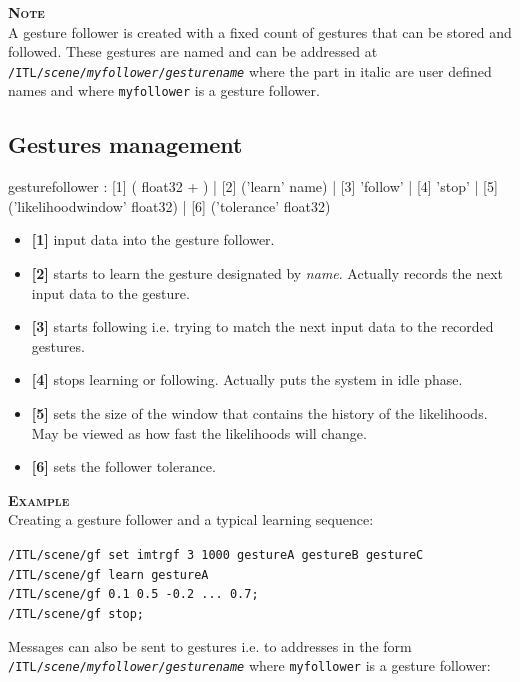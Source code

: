 \documentclass[a4paper,twoside]{report}
\newcommand{\subsublevel}[1]	{\subsection{#1}}
\newcommand{\OSC}[1]		{\texttt{#1}}
\newcommand{\example}		{\textbf{\hspace{-1.5cm}\textbf{\textsc{Example }}}}
\newcommand{\note}	[1]		{\vspace{2mm}\textbf{\hspace{-1.03cm}\textbf{\textsc{Note #1}}}}
\newcommand{\sample}	[1]			{\vspace{-2mm}\begin{center}\colorbox{mygrey}{
								\begin{minipage}[t]{0.9\columnwidth} 
								{\small \texttt{#1}}
								\end{minipage}}\end{center}}
\begin{document}
\note{} \\
A gesture follower is created with a fixed count of gestures that can be stored and followed. These gestures are named and can be addressed at \OSC{/ITL/\textit{scene}/\textit{myfollower}/\textit{gesturename}} where the part in italic are user defined names and where \OSC{myfollower} is a gesture follower.


\subsublevel{Gestures management}\label{gfmanagement}

\begin{rail}
gesturefollower :
		  [1] ( float32 + )
		| [2] ('learn' name)
		| [3] 'follow'
		| [4] 'stop'
		| [5] ('likelihoodwindow' float32)
		| [6] ('tolerance' float32)
\end{rail}

\begin{itemize}
\item \textbf{[1]} input data into the gesture follower.
\item \textbf{[2]} starts to learn the gesture designated by \emph{name}. Actually records the next input data to the gesture. 
\item \textbf{[3]} starts following i.e. trying to match the next input data to the recorded gestures.
\item \textbf{[4]} stops learning or following. Actually puts the system in idle phase.
\item \textbf{[5]} sets the size of the window that contains the history of the likelihoods. May be viewed as how fast the likelihoods	will change.
\item \textbf{[6]} sets the follower tolerance. 
\end{itemize}

\example \\
Creating a gesture follower and a typical learning sequence:
\sample{/ITL/scene/gf set imtrgf 3 1000 gestureA gestureB gestureC\\
/ITL/scene/gf learn gestureA \\
/ITL/scene/gf 0.1 0.5 -0.2 ... 0.7; \\
/ITL/scene/gf stop;
}


Messages can also be sent to gestures i.e. to addresses in the form \OSC{/ITL/\textit{scene}/\textit{myfollower}/\textit{gesturename}} where \OSC{myfollower} is a gesture follower:
\end{document}
